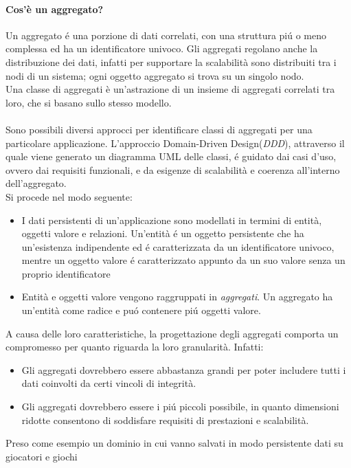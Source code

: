 \paragraph{Cos'è un aggregato?}
Un aggregato é una porzione di dati correlati, con una struttura piú o meno complessa ed ha un identificatore univoco.
Gli aggregati regolano anche la distribuzione dei dati, infatti per supportare la scalabilità sono distribuiti tra i nodi
di un sistema;
ogni oggetto aggregato si trova su un singolo nodo.\\
Una classe di aggregati è un'astrazione di un insieme di aggregati correlati tra loro, che si basano sullo stesso modello.\\
\\
Sono possibili diversi approcci per identificare classi di aggregati per una particolare applicazione.
L'approccio Domain-Driven Design(\emph{DDD}), attraverso il quale viene generato un diagramma UML delle classi,
é guidato dai casi d'uso, ovvero dai requisiti funzionali, e da esigenze di scalabilità e coerenza all'interno dell'aggregato.\\
Si procede nel modo seguente:
\begin{itemize}
    \item I dati persistenti di un'applicazione sono modellati in termini di entità, oggetti valore e
    relazioni.
    Un'entità é un oggetto persistente che ha un'esistenza indipendente ed é caratterizzata da un identificatore
    univoco, mentre un oggetto valore é caratterizzato appunto da un suo valore senza un proprio identificatore
    \item Entità e oggetti valore vengono raggruppati in \emph{aggregati}.
    Un aggregato ha un'entità come radice e puó contenere piú oggetti valore.
\end{itemize}
A causa delle loro caratteristiche, la progettazione degli aggregati comporta un compromesso per quanto riguarda
la loro granularità.
Infatti:
\begin{itemize}
    \item Gli aggregati dovrebbero essere abbastanza grandi per poter includere tutti i dati coinvolti da
    certi vincoli di integrità.
    \item Gli aggregati dovrebbero essere i piú piccoli possibile, in quanto dimensioni ridotte consentono di
    soddisfare requisiti di prestazioni e scalabilità.
\end{itemize}
Preso come esempio un dominio in cui vanno salvati in modo persistente dati su giocatori e giochi
